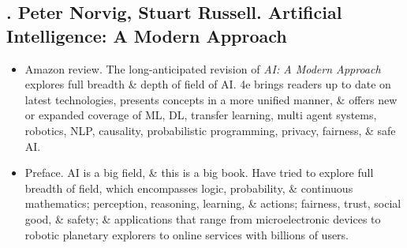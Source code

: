 \documentclass{article}
\begin{document}
\subsection{\cite{Norvig_Russel2021}. {\sc Peter Norvig, Stuart Russell}. Artificial Intelligence: A Modern Approach}
{}
\begin{itemize}
	\item {\sf Amazon review.} The long-anticipated revision of {\it AI: A Modern Approach} explores full breadth \& depth of field of AI. 4e brings readers up to date on latest technologies, presents concepts in a more unified manner, \& offers new or expanded coverage of ML, DL, transfer learning, multi agent systems, robotics, NLP, causality, probabilistic programming, privacy, fairness, \& safe AI.
	\item {\sf Preface.} AI is a big field, \& this is a big book. Have tried to explore full breadth of field, which encompasses logic, probability, \& continuous mathematics; perception, reasoning, learning, \& actions; fairness, trust, social good, \& safety; \& applications that range from microelectronic devices to robotic planetary explorers to online services with billions of users.


\end{itemize}
\end{document}
